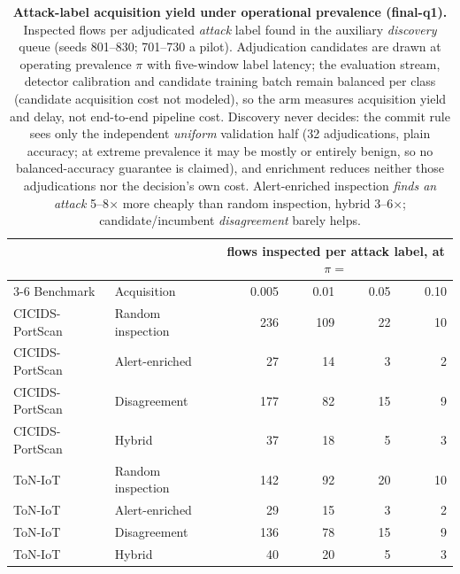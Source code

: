 \begin{table}[t]
\centering
\caption{\textbf{Attack-label acquisition yield under operational prevalence (final-q1).}
Inspected flows per adjudicated \emph{attack} label found in the auxiliary
\emph{discovery} queue (seeds 801--830; 701--730 a pilot). Adjudication candidates are
drawn at operating prevalence $\pi$ with five-window label latency; the evaluation stream,
detector calibration and candidate training batch remain balanced per class (candidate
acquisition cost not modeled), so the arm measures acquisition yield and delay, not
end-to-end pipeline cost. Discovery never decides: the commit rule sees only the independent
\emph{uniform} validation half (32 adjudications, plain accuracy; at extreme prevalence it
may be mostly or entirely benign, so no balanced-accuracy guarantee is claimed), and
enrichment reduces neither those adjudications nor the decision's own cost. Alert-enriched
inspection \emph{finds an attack} 5--8$\times$ more cheaply than random inspection,
hybrid 3--6$\times$; candidate/incumbent \emph{disagreement} barely helps.}
\label{tab:operational_e2e}
\small
\begin{tabular}{l l r r r r}
\toprule
 & & \multicolumn{4}{c}{flows inspected per attack label, at $\pi =$} \\
\cmidrule(lr){3-6}
Benchmark & Acquisition & 0.005 & 0.01 & 0.05 & 0.10 \\
\midrule
CICIDS-PortScan & Random inspection & 236 & 109 & 22 & 10 \\
CICIDS-PortScan & Alert-enriched & 27 & 14 & 3 & 2 \\
CICIDS-PortScan & Disagreement & 177 & 82 & 15 & 9 \\
CICIDS-PortScan & Hybrid & 37 & 18 & 5 & 3 \\
\addlinespace
ToN-IoT & Random inspection & 142 & 92 & 20 & 10 \\
ToN-IoT & Alert-enriched & 29 & 15 & 3 & 2 \\
ToN-IoT & Disagreement & 136 & 78 & 15 & 9 \\
ToN-IoT & Hybrid & 40 & 20 & 5 & 3 \\
\bottomrule
\end{tabular}
\end{table}
